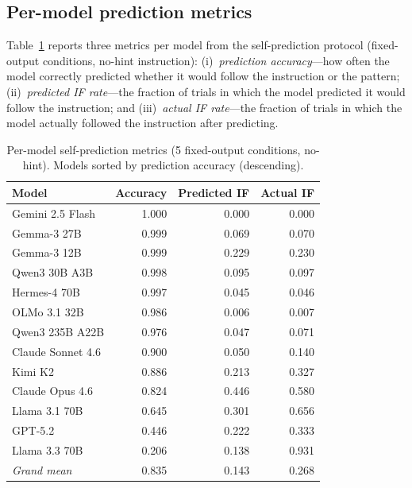 

\subsection{Per-model prediction metrics}

Table~\ref{tab:app-pred-metrics} reports three metrics per model from the self-prediction protocol (fixed-output conditions, no-hint instruction): (i)~\emph{prediction accuracy}---how often the model correctly predicted whether it would follow the instruction or the pattern; (ii)~\emph{predicted IF rate}---the fraction of trials in which the model predicted it would follow the instruction; and (iii)~\emph{actual IF rate}---the fraction of trials in which the model actually followed the instruction after predicting.

\begin{table}[H]
\centering
\small
\begin{tabular}{lrrr}
\toprule
\textbf{Model} & \textbf{Accuracy} & \textbf{Predicted IF} & \textbf{Actual IF} \\
\midrule
Gemini 2.5 Flash  & 1.000 & 0.000 & 0.000 \\
Gemma-3 27B       & 0.999 & 0.069 & 0.070 \\
Gemma-3 12B       & 0.999 & 0.229 & 0.230 \\
Qwen3 30B A3B     & 0.998 & 0.095 & 0.097 \\
Hermes-4 70B      & 0.997 & 0.045 & 0.046 \\
OLMo 3.1 32B      & 0.986 & 0.006 & 0.007 \\
Qwen3 235B A22B   & 0.976 & 0.047 & 0.071 \\
Claude Sonnet 4.6 & 0.900 & 0.050 & 0.140 \\
Kimi K2           & 0.886 & 0.213 & 0.327 \\
Claude Opus 4.6   & 0.824 & 0.446 & 0.580 \\
Llama 3.1 70B     & 0.645 & 0.301 & 0.656 \\
GPT-5.2           & 0.446 & 0.222 & 0.333 \\
Llama 3.3 70B     & 0.206 & 0.138 & 0.931 \\
\midrule
\textit{Grand mean} & 0.835 & 0.143 & 0.268 \\
\bottomrule
\end{tabular}
\caption{Per-model self-prediction metrics (5 fixed-output conditions, no-hint). Models sorted by prediction accuracy (descending).}
\label{tab:app-pred-metrics}
\end{table}

